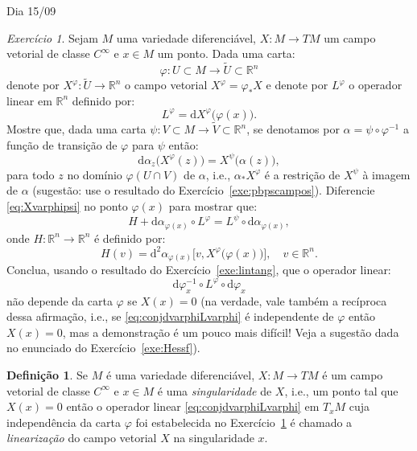 \documentclass[oneside,11pt]{amsart}
\newcommand{\R}{\mathds R}
\newcommand{\dd}{\mathrm d}
\theoremstyle{remark}\newtheorem{exercise}{Exercício}[section]
\theoremstyle{plain}\newtheorem{teo}{Teorema}[section]
\theoremstyle{plain}\newtheorem{lem}[teo]{Lema}
\theoremstyle{plain}\newtheorem{prop}[teo]{Proposição}
\theoremstyle{definition}\newtheorem{defin}[teo]{Definição}
\theoremstyle{remark}\newtheorem{rem}[teo]{Observação}
\theoremstyle{definition}\newtheorem{example}[teo]{Exemplo}
\numberwithin{equation}{section}
\begin{document}
\begin{section}{Dia 15/09}
\begin{exercise}\label{exe:linearizarX}
Sejam $M$ uma variedade diferenciável, $X:M\to TM$ um campo vetorial de classe $C^\infty$ e $x\in M$ um ponto. Dada uma carta:
\[\varphi:U\subset M\longrightarrow\widetilde U\subset\R^n\]
denote por $X^\varphi:\widetilde U\to\R^n$ o campo vetorial $X^\varphi=\varphi_*X$ e denote
por $L^\varphi$ o operador linear em $\R^n$ definido por:
\[L^\varphi=\dd X^\varphi\big(\varphi(x)\big).\]
Mostre que, dada uma carta $\psi:V\subset M\to\widetilde V\subset\R^n$, se denotamos por $\alpha=\psi\circ\varphi^{-1}$ a função de transição
de $\varphi$ para $\psi$ então:
\begin{equation}\label{eq:Xvarphipsi}
\dd\alpha_z\big(X^\varphi(z)\big)=X^\psi\big(\alpha(z)\big),
\end{equation}
para todo $z$ no domínio $\varphi(U\cap V)$ de $\alpha$, i.e., $\alpha_*X^\varphi$ é a restrição de $X^\psi$ à imagem de $\alpha$ (sugestão:
use o resultado do Exercício~\ref{exe:pbpscampos}). Diferencie \eqref{eq:Xvarphipsi} no ponto $\varphi(x)$ para mostrar que:
\[H+\dd\alpha_{\varphi(x)}\circ L^\varphi=L^\psi\circ\dd\alpha_{\varphi(x)},\]
onde $H:\R^n\to\R^n$ é definido por:
\[H(v)=\dd^2\alpha_{\varphi(x)}\big[v,X^\varphi\big(\varphi(x)\big)\big],\quad v\in\R^n.\]
Conclua, usando o resultado do Exercício~\ref{exe:lintang}, que o operador linear:
\begin{equation}\label{eq:conjdvarphiLvarphi}
\dd\varphi_x^{-1}\circ L^\varphi\circ\dd\varphi_x
\end{equation}
não depende da carta $\varphi$ se $X(x)=0$ (na verdade, vale também a recíproca dessa afirmação, i.e., se \eqref{eq:conjdvarphiLvarphi} é independente
de $\varphi$ então $X(x)=0$, mas a demonstração é um pouco mais difícil! Veja a sugestão dada no enunciado do Exercício~\ref{exe:Hessf}).
\end{exercise}

\begin{defin}
Se $M$ é uma variedade diferenciável, $X:M\to TM$ é um campo vetorial de classe $C^\infty$ e $x\in M$ é uma {\em singularidade\/} de $X$, i.e., um ponto
tal que $X(x)=0$ então o operador linear \eqref{eq:conjdvarphiLvarphi} em $T_xM$ cuja independência da carta $\varphi$ foi estabelecida
no Exercício~\ref{exe:linearizarX} é chamado a {\em linearização\/} do campo vetorial $X$ na singularidade $x$.
\end{defin}

\end{section}
\end{document}
